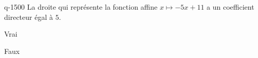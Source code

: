 \begin{truefalse}{q-1500}
La droite qui représente la fonction affine $x\mapsto -5x+11$ a un coefficient directeur égal à $5$.
\item Vrai
\item* Faux
\end{truefalse}

